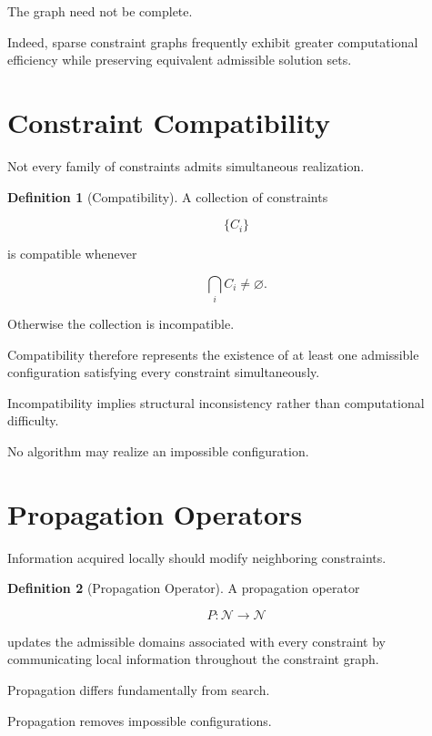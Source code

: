 \documentclass[11pt,oneside]{book}
\numberwithin{equation}{chapter}
\theoremstyle{definition}
\newtheorem{definition}{Definition}[chapter]
\theoremstyle{plain}
\begin{document}
The graph need not be complete.

Indeed, sparse constraint graphs frequently exhibit greater computational
efficiency while preserving equivalent admissible solution sets.

\section{Constraint Compatibility}

Not every family of constraints admits simultaneous realization.

\begin{definition}[Compatibility]

A collection of constraints

\[
\{C_i\}
\]

is compatible whenever

\[
\bigcap_i C_i
\neq
\varnothing.
\]

Otherwise the collection is incompatible.

\end{definition}

Compatibility therefore represents the existence of at least one admissible
configuration satisfying every constraint simultaneously.

Incompatibility implies structural inconsistency rather than computational
difficulty.

No algorithm may realize an impossible configuration.

\section{Propagation Operators}

Information acquired locally should modify neighboring constraints.

\begin{definition}[Propagation Operator]

A propagation operator

\[
P:
\mathcal{N}
\rightarrow
\mathcal{N}
\]

updates the admissible domains associated with every constraint by
communicating local information throughout the constraint graph.

\end{definition}

Propagation differs fundamentally from search.

Propagation removes impossible configurations.
\end{document}
